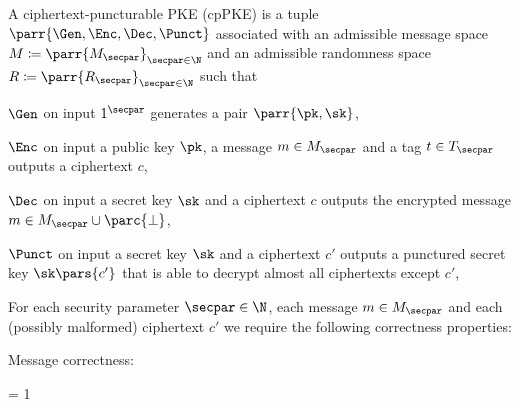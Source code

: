\begin{definition}
    A ciphertext-puncturable PKE (cpPKE) is a tuple \(\parr{\Gen,\Enc,\Dec,\Punct}\) associated with an admissible message space \(M \coloneqq \parr{M_\secpar}_{\secpar \in \N}\) and
    an admissible randomness space \(R \coloneqq \parr{R_\secpar}_{\secpar \in \N}\) such that
    \begin{sitemize}
        \item \(\Gen\) on input \(1^\secpar\) generates a pair \(\parr{\pk,\sk}\),
        \item \(\Enc\) on input a public key \(\pk\), a message \(m \in M_\secpar\) and a tag \(t \in T_\secpar\) outputs a ciphertext \(c\),
        \item \(\Dec\) on input a secret key \(\sk\) and a ciphertext \(c\) outputs the encrypted message \(m \in M_\secpar \cup \parc{\bot}\),
        \item \(\Punct\) on input a secret key \(\sk\) and a ciphertext \(c'\) outputs a punctured secret key \(\sk\pars{c'}\) that is able to decrypt almost all ciphertexts except \(c'\),
    \end{sitemize}
    For each security parameter \(\secpar \in \N\),
    each message \(m \in M_\secpar\) and
    each (possibly malformed) ciphertext \(c'\) we require the following correctness properties:
    \begin{sitemize}
        \item Message correctness:
        \begin{bralign}
            = 1
        \end{bralign}


\end{sitemize}
\end{definition}
